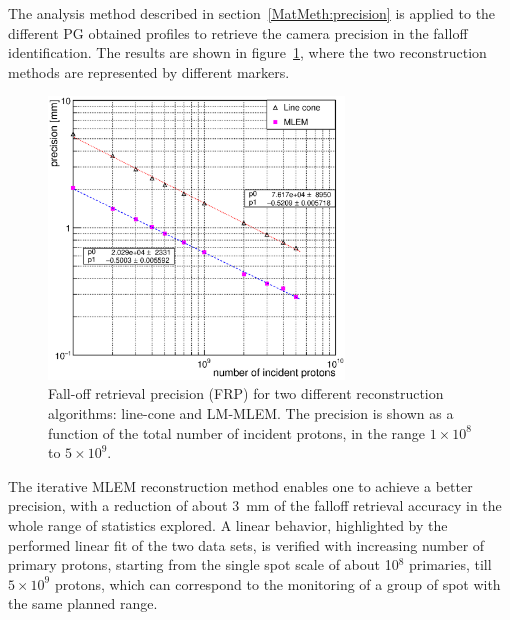 The analysis method described in section~\ref{MatMeth:precision} is applied to the different PG obtained profiles to retrieve the camera precision in the falloff identification. The results are shown in figure~\ref{fig:precision}, where the two reconstruction methods are represented by different markers.

\begin{figure}	
\centering
\includegraphics[width=0.7\textwidth]{./Figure/2017-10-21_Precision_Comparaison_linecone_MLEM_Article_Fit.eps}
\caption{Fall-off retrieval precision (FRP) for two different reconstruction algorithms: line-cone and LM-MLEM. The precision is shown as a function of the total number of incident protons, in the range $1\times10^{8}$ to $5\times10^{9}$.}	
\label{fig:precision}
\end{figure}

The iterative MLEM reconstruction method enables one to achieve a better precision, with a reduction of about 3~mm of the falloff retrieval accuracy in the whole range of statistics explored. A linear behavior, highlighted by the performed linear fit of the two data sets, is verified with increasing number of primary protons, starting from the single spot scale of about 10$^8$ primaries, till $5\times10^9$ protons, which can correspond to the monitoring of a group of spot with the same planned range. 

